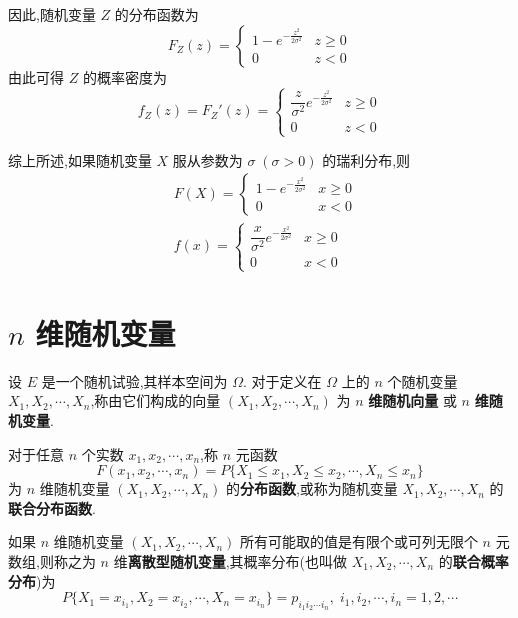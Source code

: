 因此,随机变量 $Z$ 的分布函数为
$$
F_{Z}(z) = \begin{cases}
    1 - e^{-\frac{z^2}{2 \sigma^2}} & z \geqslant 0 \\
    0 & z<0
\end{cases}
$$
由此可得 $Z$ 的概率密度为
$$
f_{Z}(z) = F_{Z}'(z) = \begin{cases}
    \dfrac{z}{\sigma^2} e^{-\frac{z^2}{2 \sigma^2}} & z \geqslant 0 \\[0.5em]
    0 & z<0
\end{cases}
$$

综上所述,如果随机变量 $X$ 服从参数为 $\sigma \; (\sigma > 0)$ 的瑞利分布,则
$$
\begin{aligned}
    & F(X) = \begin{cases}
        1 - e^{-\frac{x^2}{2 \sigma^2}} & x \geqslant 0 \\
        0 & x<0
    \end{cases} \\[0.5em]
    & f(x) = \begin{cases}
        \dfrac{x}{\sigma^2} e^{-\frac{x^2}{2 \sigma^2}} & x \geqslant 0 \\[0.5em]
        0 & x<0
    \end{cases}
\end{aligned}
$$

\section{\texorpdfstring{$n$}{} 维随机变量}

\begin{definition}
    设 $E$ 是一个随机试验,其样本空间为 $\varOmega$. 对于定义在 $\varOmega$ 上的 $n$ 个随机变量 $X_1,X_2,\cdots,X_n$,称由它们构成的向量 $(X_1,X_2,\cdots,X_n)$ 为 $n$ \textbf{维随机向量} 或 $n$ \textbf{维随机变量}.
\end{definition}

\begin{definition}
    对于任意 $n$ 个实数 $x_1,x_2,\cdots,x_n$,称 $n$ 元函数
    $$
    F(x_1,x_2,\cdots,x_n) = P\{X_1 \leqslant x_1, X_2 \leqslant x_2, \cdots, X_n \leqslant x_n\}
    $$
    为 $n$ 维随机变量 $(X_1,X_2,\cdots,X_n)$ 的\textbf{分布函数},或称为随机变量 $X_1,X_2,\cdots,X_n$ 的\textbf{联合分布函数}.
\end{definition}

\begin{definition}
    如果 $n$ 维随机变量 $(X_1,X_2,\cdots,X_n)$ 所有可能取的值是有限个或可列无限个 $n$ 元数组,则称之为 $n$ 维\textbf{离散型随机变量},其概率分布(也叫做 $X_1,X_2,\cdots,X_n$ 的\textbf{联合概率分布})为
    $$
    P\{X_1 = x_{i_1}, X_2 = x_{i_2}, \cdots, X_n = x_{i_n}\} = p_{i_1 i_2 \cdots i_n}, \; i_1, i_2, \cdots, i_n = 1,2,\cdots
    $$
\end{definition}

